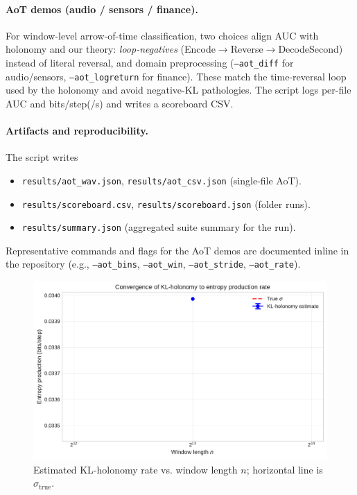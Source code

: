 \documentclass[11pt]{article}
\newcommand{\1}{\mathbbm{1}}
\begin{document}
\paragraph{AoT demos (audio / sensors / finance).} For window-level arrow-of-time classification, two choices align AUC with holonomy and our theory: \emph{loop-negatives}
(Encode$\to$Reverse$\to$DecodeSecond) instead of literal reversal, and domain preprocessing (\texttt{--aot\_diff} for audio/sensors, \texttt{--aot\_logreturn} for finance). These match the time-reversal loop used by the holonomy and avoid negative-KL pathologies. The script logs per-file AUC and bits/step(/s) and writes a scoreboard CSV.

\paragraph{Artifacts and reproducibility.} The script writes
\begin{itemize}[leftmargin=1.25em]
\item \texttt{results/aot\_wav.json}, \texttt{results/aot\_csv.json} (single-file AoT).
\item \texttt{results/scoreboard.csv}, \texttt{results/scoreboard.json} (folder runs).
\item \texttt{results/summary.json} (aggregated suite summary for the run).
\end{itemize}
Representative commands and flags for the AoT demos are documented inline in the repository (e.g., \texttt{--aot\_bins}, \texttt{--aot\_win}, \texttt{--aot\_stride}, \texttt{--aot\_rate}).



\begin{figure}[t]
  \centering
  \includegraphics[width=0.9\linewidth]{figures/markov_convergence.pdf}
  \caption{Estimated KL-holonomy rate vs. window length $n$; horizontal line is $\sigma_{\text{true}}$.}
  \label{fig:markov-conv}
\end{figure}
\end{document}

